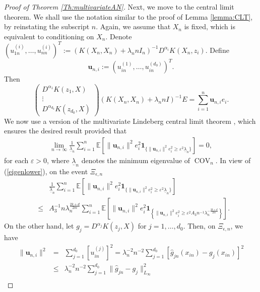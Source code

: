 \documentclass[12pt]{article}
\theoremstyle{plain}
\theoremstyle{remark}
\begin{document}
\begin{proof}[Proof of Theorem \ref{Th:multivariateAN}]
    Next, we move to the central limit theorem. We shall use the notation similar to the proof of Lemma \ref{lemma:CLT}, by reinstating the subscript $n$. Again, we assume that $X_n$ is fixed, which is equivalent to conditioning on $X_n$.
    Denote $\left(u_{1n}^{(i)},\ldots,u_{nn}^{(i)}\right)^T:=(K(X_n,X_n)+\lambda_n n I_n)^{-1}D^{\alpha_i}K(X_n,z_i)$. Define
    \[\mathbf{u}_{n,i}:=\left(u_{in}^{(1)},\ldots,u_{in}^{(d_0)}\right)^T.\]
    Then
    \[\begin{pmatrix}
        D^{\alpha_1} K(z_1,X)\\
        \vdots\\
        D^{\alpha_{d_0}}K(z_{d_0},X)
    \end{pmatrix}(K(X_n,X_n)+\lambda_n n I)^{-1}E=\sum_{i=1}^n \mathbf{u}_{n,i}e_i.\]
    We now use a version of the multivariate Lindeberg central limit theorem \cite{hansen2022econometrics}, which ensures the desired result provided that
    \begin{eqnarray}\label{MVLindeberg}
        \lim_{n\rightarrow \infty}\frac{1}{\underline{\lambda}_n}\sum_{i=1}^n\mathbb{E}\left[\|\mathbf{u}_{n,i}\|^2e_i^2\mathbf{1}_{\{\|\mathbf{u}_{n,i}\|^2e_i^2\geq \varepsilon^2 \underline{\lambda}_n\}}\right]=0,
    \end{eqnarray}
    for each $\varepsilon>0$, where $\underline{\lambda}_n$ denotes the minimum eigenvalue of $\operatorname{COV}_n$. In view of (\ref{eigenlower}), on the event $\Xi_{\epsilon,n}$
    \begin{eqnarray}
        &&\frac{1}{\underline{\lambda}_n}\sum_{i=1}^n\mathbb{E}\left[\|\mathbf{u}_{n,i}\|^2e_i^2\mathbf{1}_{\{\|\mathbf{u}_{n,i}\|^2e_i^2\geq \varepsilon^2 \underline{\lambda}_n\}}\right]\nonumber\\
        &\leq& A_3^{-1}n\lambda_n^{\frac{2k+d}{2m}}\sum_{i=1}^n\mathbb{E}\left[\|\mathbf{u}_{n,i}\|^2e_i^2\mathbf{1}_{\left\{\|\mathbf{u}_{n,i}\|^2e_i^2\geq \varepsilon^2 A_3n^{-1}\lambda_n^{-\frac{2k+d}{2m}}\right\}}\right].\label{MVe1}
    \end{eqnarray}
    On the other hand, let $g_j=D^{\alpha_j} K(z_j,X)$ for $j=1,\ldots,d_0$. Then, on $\Xi_{\epsilon,n}$, we have
    \begin{eqnarray}
        \|\mathbf{u}_{n,i}\|^2&=&\sum_{j=1}^{d_0}\left[u^{(j)}_{in}\right]^2=\lambda_n^{-2}n^{-2}\sum_{j=1}^{d_0}\left[\hat{g}_{jn}(x_{in})-g_j(x_{in})\right]^2\nonumber\\
        &\leq&\lambda_n^{-2}n^{-2}\sum_{j=1}^{d_0}\|\hat{g}_{jn}-g_j\|^2_{L_\infty}\nonumber\\

\end{eqnarray}
\end{proof}
\end{document}

